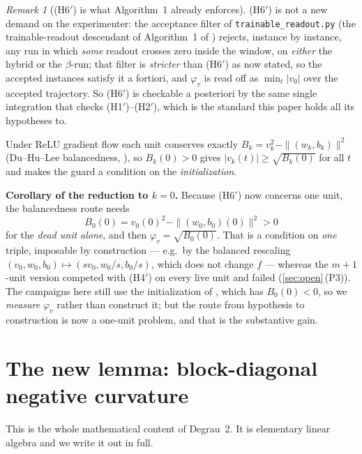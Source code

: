 \documentclass[11pt]{article}
\theoremstyle{remark}
\newtheorem{remark}[theorem]{Remark}
\newcommand{\hyplabel}[1]{\textup{(#1)}}
\begin{document}
\begin{remark}[\hyplabel{H6$'$} is what Algorithm~1 already enforces]
\hyplabel{H6$'$} is not a new demand on the experimenter: the acceptance filter
of \texttt{trainable\_readout.py} (the trainable-readout descendant of
Algorithm~1 of \cite{paper}) rejects, instance by instance, any run in which
\emph{some} readout crosses zero inside the window, on \emph{either} the hybrid
or the $\beta$-run; that filter is \emph{stricter} than \hyplabel{H6$'$} as now
stated, so the accepted instances satisfy it a fortiori, and $\varphi_v$ is read
off as $\min_t|v_0|$ over the accepted trajectory. So \hyplabel{H6$'$} is checkable a posteriori by the same
single integration that checks \hyplabel{H1$'$}--\hyplabel{H2$'$}, which is the
standard this paper holds all its hypotheses to.

Under ReLU gradient flow each unit conserves exactly
$B_k=v_k^2-\|(w_k,b_k)\|^2$ (Du--Hu--Lee balancedness, \cite{duhulee}), so
$B_k(0)>0$ gives $|v_k(t)|\ge\sqrt{B_k(0)}$ for all $t$ and makes the guard a
condition on the \emph{initialization}.

\textbf{Corollary of the reduction to $k=0$.} Because \hyplabel{H6$'$} now
concerns one unit, the balancedness route needs
\[
B_0(0)=v_0(0)^2-\|(w_0,b_0)(0)\|^2>0
\]
for the \emph{dead unit alone}, and then $\varphi_v=\sqrt{B_0(0)}$. That is a
condition on \emph{one} triple, imposable by construction --- e.g.\ by the
balanced rescaling $(v_0,w_0,b_0)\mapsto(sv_0,w_0/s,b_0/s)$, which does not
change $f$ --- whereas the $m+1$-unit version competed with \hyplabel{H4$'$} on
every live unit and failed (\cref{sec:open}\,(P3)). The campaigns here still use
the initialization of \cite{paper}, which has $B_0(0)<0$, so we \emph{measure}
$\varphi_v$ rather than construct it; but the route from hypothesis to
construction is now a one-unit problem, and that is the substantive gain.
\end{remark}

\section{The new lemma: block-diagonal negative curvature}\label{sec:lema}

This is the whole mathematical content of Degrau~2. It is elementary linear
algebra and we write it out in full.
\end{document}
